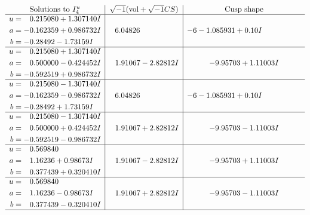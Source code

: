 \documentclass[1p]{elsarticle_modified}
\theoremstyle{definition}
\newcommand{\I}{\sqrt{-1}}
\begin{document}
$$\begin{array}{c|c|c}  
\text{Solutions to }I^u_{4}& \I (\text{vol} + \sqrt{-1}CS) & \text{Cusp shape}\\
 \hline 
\begin{aligned}
u &= \phantom{-}0.215080 + 1.307140 I \\
a &= -0.162359 + 0.986732 I \\
b &= -0.28492 - 1.73159 I\end{aligned}
 & \phantom{-}6.04826\phantom{ +0.000000I} &                  -6
-1.085931 + 0. 10   I\phantom{ +0.000000I} \\ \hline\begin{aligned}
u &= \phantom{-}0.215080 + 1.307140 I \\
a &= \phantom{-}0.500000 - 0.424452 I \\
b &= -0.592519 + 0.986732 I\end{aligned}
 & \phantom{-}1.91067 - 2.82812 I & -9.95703 + 1.11003 I \\ \hline\begin{aligned}
u &= \phantom{-}0.215080 - 1.307140 I \\
a &= -0.162359 - 0.986732 I \\
b &= -0.28492 + 1.73159 I\end{aligned}
 & \phantom{-}6.04826\phantom{ +0.000000I} &                  -6
-1.085931 + 0. 10   I\phantom{ +0.000000I} \\ \hline\begin{aligned}
u &= \phantom{-}0.215080 - 1.307140 I \\
a &= \phantom{-}0.500000 + 0.424452 I \\
b &= -0.592519 - 0.986732 I\end{aligned}
 & \phantom{-}1.91067 + 2.82812 I & -9.95703 - 1.11003 I \\ \hline\begin{aligned}
u &= \phantom{-}0.569840\phantom{ +0.000000I} \\
a &= \phantom{-}1.16236 + 0.98673 I \\
b &= \phantom{-}0.377439 + 0.320410 I\end{aligned}
 & \phantom{-}1.91067 - 2.82812 I & -9.95703 + 1.11003 I \\ \hline\begin{aligned}
u &= \phantom{-}0.569840\phantom{ +0.000000I} \\
a &= \phantom{-}1.16236 - 0.98673 I \\
b &= \phantom{-}0.377439 - 0.320410 I\end{aligned}
 & \phantom{-}1.91067 + 2.82812 I & -9.95703 - 1.11003 I\\
 \hline 
 \end{array}$$\newpage
\end{document}
